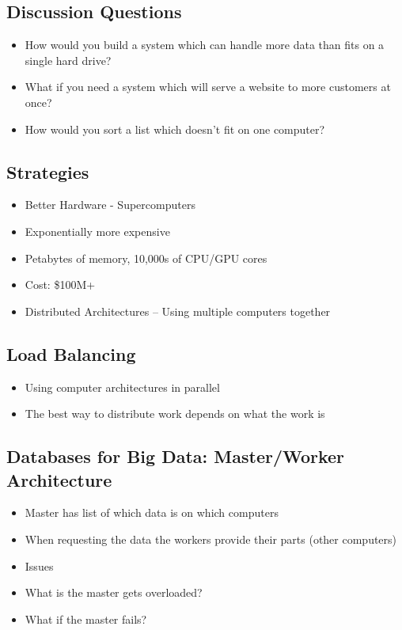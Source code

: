 \documentclass[
]{book}
\providecommand{\tightlist}{%
  \setlength{\itemsep}{0pt}\setlength{\parskip}{0pt}}
\begin{document}
\subsection{Discussion Questions}\label{discussion-questions}

\begin{itemize}
\tightlist
\item
  How would you build a system which can handle more data than fits on a single hard drive?
\item
  What if you need a system which will serve a website to more customers at once?
\item
  How would you sort a list which doesn't fit on one computer?
\end{itemize}

\subsection{Strategies}\label{strategies}

\begin{itemize}
\tightlist
\item
  Better Hardware - Supercomputers
\item
  Exponentially more expensive
\item
  Petabytes of memory, 10,000s of CPU/GPU cores
\item
  Cost: \$100M+
\item
  Distributed Architectures -- Using multiple computers together
\end{itemize}

\subsection{Load Balancing}\label{load-balancing}

\begin{itemize}
\tightlist
\item
  Using computer architectures in parallel
\item
  The best way to distribute work depends on what the work is
\end{itemize}

\subsection{Databases for Big Data: Master/Worker Architecture}\label{databases-for-big-data-masterworker-architecture}

\begin{itemize}
\tightlist
\item
  Master has list of which data is on which computers
\item
  When requesting the data the workers provide their parts (other computers)
\item
  Issues
\item
  What is the master gets overloaded?
\item
  What if the master fails?
\end{itemize}
\end{document}
